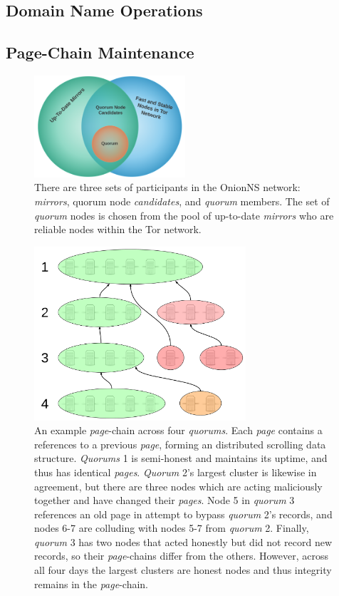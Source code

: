 \subsection{Domain Name Operations}



\subsection{Page-Chain Maintenance}

\begin{figure}[htbp]
	\centering
	\includegraphics[width=0.5\textwidth]{images/LucidCharts/Participants.png}
	\caption{There are three sets of participants in the OnionNS network: \emph{mirrors}, quorum node \emph{candidates}, and \emph{quorum} members. The set of \emph{quorum} nodes is chosen from the pool of up-to-date \emph{mirrors} who are reliable nodes within the Tor network.}
\end{figure}

\begin{figure}[htbp]
	\centering
	\includegraphics[width=0.7\textwidth]{images/LucidCharts/Page-chain.png}
	\caption{An example \emph{page}-chain across four \emph{quorums}. Each \emph{page} contains a references to a previous \emph{page}, forming an distributed scrolling data structure. \emph{Quorums} 1 is semi-honest and maintains its uptime, and thus has identical \emph{pages}. \emph{Quorum} 2's largest cluster is likewise in agreement, but there are three nodes which are acting maliciously together and have changed their \emph{pages}. Node 5 in \emph{quorum} 3 references an old page in attempt to bypass \emph{quorum} 2's records, and nodes 6-7 are colluding with nodes 5-7 from \emph{quorum} 2. Finally, \emph{quorum} 3 has two nodes that acted honestly but did not record new records, so their \emph{page}-chains differ from the others. However, across all four days the largest clusters are honest nodes and thus integrity remains in the \emph{page}-chain.}
\end{figure}

